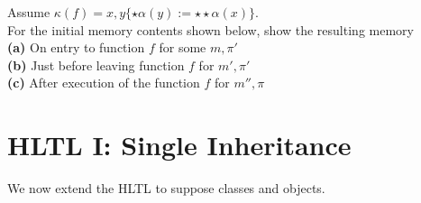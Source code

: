 \frmrule

\begin{example}
Assume $\kappa(f) = x,y \{ \star \alpha(y) := \star \star \alpha(x) \}$. \\
For the initial memory contents shown below, show the resulting memory \\
\textbf{(a)} On entry to function $f$ for some $m, \pi'$ \\
\textbf{(b)} Just before leaving function $f$ for $m', \pi'$ \\
\textbf{(c)} After execution of the function $f$ for $m'', \pi$ \\

\end{example}

\frmrule





\section{HLTL I: Single Inheritance}

We now extend the HLTL to suppose classes and objects.  

